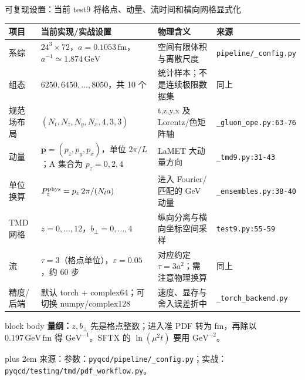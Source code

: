 \documentclass[UTF8,aspectratio=169,11pt]{ctexbeamer}
\renewcommand{\arraystretch}{0.92}
\newcommand{\source}[1]{%
  \par\vspace{0.02em}\begingroup\fontsize{6}{6.8}\selectfont\raggedright\sloppy
  \setlength{\emergencystretch}{3em}\rightskip=0pt plus 2em
  \color{muted}来源：#1\par\endgroup}
\begin{document}
\begin{frame}[t]{可复现设置：当前 test9 将格点、动量、流时间和横向网格显式化}
  \footnotesize
  \renewcommand{\arraystretch}{0.64}
  \begin{tabularx}{0.98\textwidth}{@{}p{}Yp{0.22\textwidth}Y@{}}
    \toprule
    项目 & 当前实现/实战设置 & 物理含义 & 来源\\
    \midrule
    系综 & \(24^3\times72\)，\(a=0.1053\,\mathrm{fm}\)，\(a^{-1}\simeq1.874\,\mathrm{GeV}\) & 空间有限体积与离散尺度 & \nolinkurl{pipeline/_config.py}\\
    组态 & \(6250,6450,\ldots,8050\)，共 10 个 & 统计样本；不是连续极限数据集 & 同上\\
    规范场布局 & \((N_t,N_z,N_y,N_x,4,3,3)\) & t,z,y,x 及 Lorentz/色矩阵轴 & \nolinkurl{_gluon_ope.py:63-76}\\
    动量 & \(\boldsymbol p=(p_z,p_y,p_x)\)，单位 \(2\pi/L\)；A 集合为 \(p_z=0,2,4\) & LaMET 大动量方向 & \nolinkurl{_tmd9.py:31-43}\\
    单位换算 & \(P_z^{\rm phys}=p_z\,2\pi/(N_l a)\) & 进入 Fourier/匹配的 GeV 动量 & \nolinkurl{_ensembles.py:38-40}\\
    TMD 网格 & \(z=0,\ldots,12\)，\(b_\perp=0,\ldots,4\) & 纵向分离与横向坐标空间采样 & \nolinkurl{test9.py:55-59}\\
    流 & \(\tau=3\)（格点单位），\(\varepsilon=0.05\)，约 60 步 & 对应约定 \(\tau=3a^2\)；需注意物理换算 & 同上\\
    精度/后端 & 默认 torch + complex64；可切换 numpy/complex128 & 速度、显存与舍入误差折中 & \nolinkurl{_torch_backend.py}\\
    \bottomrule
  \end{tabularx}
  \vspace{0.08em}
  \begin{beamercolorbox}[wd=0.98\textwidth,sep=0.05em,rounded=true]{block body}
    \scriptsize\textbf{量纲：}\(z,b_\perp\) 先是格点整数；进入准 PDF 转为 fm，再除以
    \(0.197\,\mathrm{GeV\,fm}\) 得 \(\mathrm{GeV}^{-1}\)。SFTX 的 \(\ln(\mu^2t)\) 要用 \(\mathrm{GeV}^{-2}\)。
  \end{beamercolorbox}
  \vspace{-0.12em}
  \vspace{-0.20em}
  \source{参数：\nolinkurl{pyqcd/pipeline/_config.py}；实战：\nolinkurl{pyqcd/testing/tmd/pdf_workflow.py}。}
\end{frame}
\end{document}
